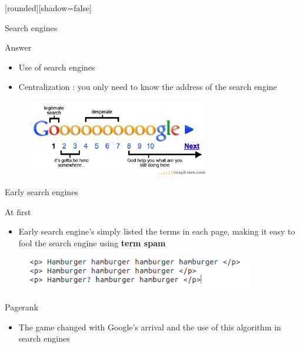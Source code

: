 \documentclass[10pt]{beamer}
\begin{document}
[rounded][shadow=false]
\begin{frame}{Search engines}
  \begin{block}{Answer}
    \begin{itemize}
      \item Use of search engines
      \item Centralization : you only need to know the address of the search engine
    \end{itemize}
  \end{block}
  \begin{figure}
    \centering
    \includegraphics[width = 8cm]{google-search-result-pages.png}
  \end{figure}

\end{frame}


\begin{frame}{Early search engines}
  \begin{block}{At first}
    \begin{itemize}
      \item Early search engine's simply listed the terms in each page, making it easy to fool the search engine using \textbf{term spam}

    \end{itemize}
  \end{block}
  \begin{figure}
    \includegraphics[width = 10cm]{termspam.png}
  \end{figure}
  \begin{block}{Pagerank}
    \begin{itemize}
      \item The game changed with Google's arrival and the use of this algorithm in search engines
    \end{itemize}
  \end{block}
\end{frame}
\end{document}
